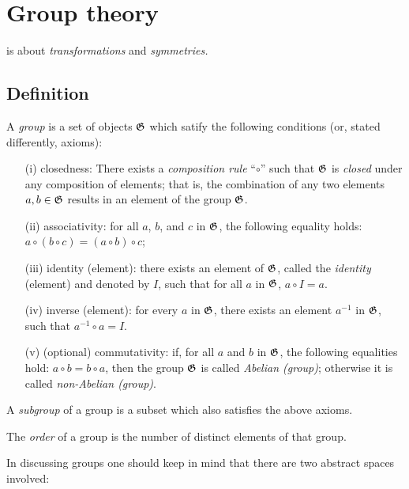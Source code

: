 \chapter{Group theory}
\label{2012-m-ch-gt}

 is about {\em transformations} and {\em symmetries.}

\section{Definition}

A {\em group} is a set of objects ${\frak G}$ which satify   the following conditions (or, stated differently, axioms):

\begin{itemize}
\item[(i)] closedness:
There exists a {\em composition rule} ``$\circ$'' such that ${\frak G}$ is {\em closed} under any composition
of elements; that is, the combination of any two elements
$a,b \in {\frak G}$ results in an element of the group ${\frak G}$.
\item[(ii)]
associativity:
for all $a$, $b$, and $c$ in ${\frak G}$,
the following equality holds: $a \circ (b \circ c) = (a \circ b) \circ c$;
\item[(iii)]
identity (element):
there exists an element of ${\frak G}$,
called the  {\em identity} (element) and denoted by $I$, such that for all $a$ in ${\frak G}$,
$a \circ I = a$.
\item[(iv)]
inverse (element):
for every $a$ in ${\frak G}$, there exists an element $a^{-1}$ in ${\frak G}$, such that $a^{-1} \circ  a  = I$.
\item[(v)]
(optional) commutativity:
if, for all $a$ and $b$ in ${\frak G}$, the following equalities hold: $a \circ b = b \circ a$,
then the group ${\frak G}$ is called {\em Abelian (group)}; otherwise it is called {\em non-Abelian (group)}.
\end{itemize}

A {\em subgroup} of a group is a subset which also satisfies the above axioms.


The {\em order} of a group is the number of distinct elements of that group.

In discussing groups one should keep in mind that there are two abstract spaces involved:

